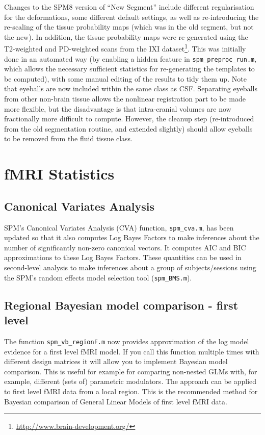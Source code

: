 \documentclass[a4paper,titlepage,openany]{article}
\begin{document}
\begin{multicols}{2}
Changes to the SPM8 version of ``New Segment'' include different regularisation for the deformations, some different default settings, as well as re-introducing the re-scaling of the tissue probability maps (which was in the old segment, but not the new).  In addition, the tissue probability maps were re-generated using the T2-weighted and PD-weighted scans from the IXI dataset\footnote{\url{http://www.brain-development.org/}}.
This was initially done in an automated way (by enabling a hidden feature in \texttt{spm\_preproc\_run.m}, which allows the necessary sufficient statistics for re-generating the templates to be computed), with some manual editing of the results to tidy them up.
Note that eyeballs are now included within the same class as CSF.
Separating eyeballs from other non-brain tissue allows the nonlinear registration part to be made more flexible, but the disadvantage is that intra-cranial volumes are now fractionally more difficult to compute.
However, the cleanup step (re-introduced from the old segmentation routine, and extended slightly) should allow eyeballs to be removed from the fluid tissue class.

\section{fMRI Statistics}

\subsection{Canonical Variates Analysis}

SPM's Canonical Variates Analysis (CVA) function, \texttt{spm\_cva.m}, has been updated so that it also computes Log Bayes Factors to make inferences about the number of significantly non-zero canonical vectors. It computes AIC and BIC approximations to these Log Bayes Factors. These quantities can be used in second-level analysis to make inferences about a group of subjects/sessions using the SPM's random effects model selection tool (\texttt{spm\_BMS.m}).

\subsection{Regional Bayesian model comparison - first level}

The function \texttt{spm\_vb\_regionF.m} now provides approximation of the log model evidence for a first level fMRI model. If you call this function multiple times with different design matrices it will allow you to implement Bayesian model comparison. This is useful for example for comparing non-nested GLMs with, for example, different (sets of) parametric modulators. The approach can be applied to first level fMRI data from a local region. This is the recommended method for Bayesian comparison of General Linear Models of first level fMRI data.


\end{multicols}
\end{document}
